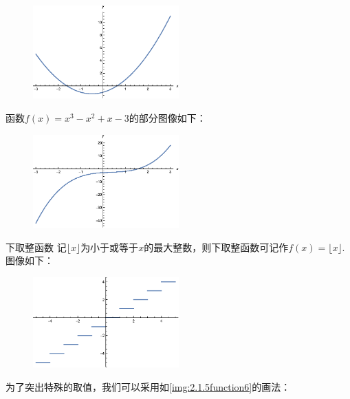 \documentclass[lang=cn,math=cm,chinesefont=nofont,11pt,scheme=chinese,onecol]{elegantbook}
\begin{document}
\begin{figure}[h]
  \centering
  \includegraphics[width=0.5\textwidth]{image/2.1.5function1.eps}
  \label{img:2.1.5function1}
\end{figure}

\begin{example}
  函数$f(x)=x^3-x^2+x-3$的部分图像如下：
\end{example}

\begin{figure}[h]
  \centering
  \includegraphics[width=0.5\textwidth]{image/2.1.5function2.eps}
  \label{img:2.1.5function2}
\end{figure}

\begin{example}{下取整函数}
  记$\lfloor x\rfloor $为小于或等于$x$的最大整数，则下取整函数可记作$f(x)=\lfloor x\rfloor$.图像如下：
\end{example}

\begin{figure}[h]
  \centering
  \includegraphics[width=0.5\textwidth]{image/2.1.5function5.eps}
  \label{img:2.1.5function5}
\end{figure}

为了突出特殊的取值，我们可以采用如\ref{img:2.1.5function6}的画法：
\end{document}
